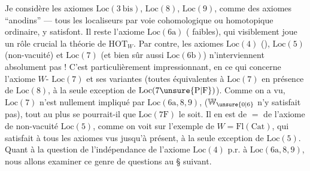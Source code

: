 Je considère les axiomes $\mathrm{Loc}(3\ \mathrm{bis})$,
$\mathrm{Loc}(8)$, $\mathrm{Loc}(9)$, comme des axiomes
``anodins'' --- tous les localiseurs 
 par voie cohomologique ou homotopique
ordinaire, y satisfont. Il reste l'axiome
$\mathrm{Loc}(6\mathrm{a})$    ( faibles),
qui visiblement joue un rôle crucial
 la théorie de $\mathrm{HOT}_{W}$. Par contre,
les axiomes $\mathrm{Loc}(4)$\deleted{\unsure{,}} (),
$\mathrm{Loc}(5)$ (non-vacuité) et $\mathrm{Loc}(7)$
(et bien sûr aussi $\mathrm{Loc}(6\mathrm{b})$) n'interviennent
absolument pas ! C'est particulièrement
impressionnant, en ce qui
concerne l'axiome  $W$-
$\mathrm{Loc}(7)$ et ses variantes (toutes équivalentes
à $\mathrm{Loc}(7)$ en présence de $\mathrm{Loc}(8)$, à la
seule exception de $\mathrm{Loc}(7\unsure{\mathrm{P}|\mathrm{F}})$). Comme
on a vu, $\mathrm{Loc}(7)$ n'est nullement impliqué
par $\mathrm{Loc}(6\mathrm{a},8,9)$,  ($\mathbb{W}_{\unsure{0|6}}$ n'y
satisfait pas), tout au plus se pourrait-il
que $\mathrm{Loc}(7\mathrm{F})$ le soit. Il en
est de $=$ de l'axiome de non-vacuité
$\mathrm{Loc}(5)$, comme on voit sur l'exemple
de $W=\mathrm{Fl}(\mathrm{Cat})$, qui satisfait à tous les
axiomes vus jusqu'à présent, à la seule exception
de $\mathrm{Loc}(5)$. Quant à la question de l'indépendance
de l'axiome $\mathrm{Loc}(4)$ p.r.
à $\mathrm{Loc}(6\mathrm{a},8,9)$, nous allons examiner
ce genre de questions au \S{} suivant.

